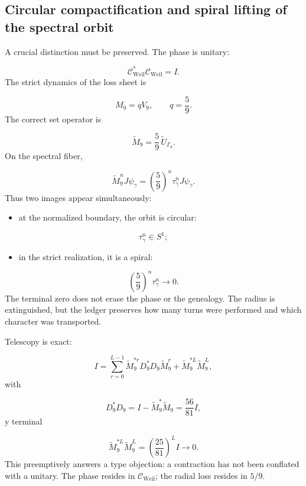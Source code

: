 \subsection{Circular compactification and spiral lifting of the spectral orbit}
A crucial distinction must be preserved. The phase is unitary:\par
\[
\mathcal C_{\mathrm{Weil}}^*
\mathcal C_{\mathrm{Weil}}=I.
\]
The strict dynamics of the loss sheet is\par
\[
M_9=qV_9,
\qquad
q=\frac59.
\]
The correct set operator is\par
\[
\widetilde M_9
=
\frac59\,\widetilde U_{\Gamma_9}.
\]
On the spectral fiber,\par
\[
\widetilde M_9^nJ\psi_\gamma
=
\left(\frac59\right)^n
\tau_\gamma^n
J\psi_\gamma.
\]
Thus two images appear simultaneously:\par
\begin{itemize}
\item at the normalized boundary, the orbit is circular:
\end{itemize}
  \[
  \tau_\gamma^n\in S^1;
  \]
\begin{itemize}
\item in the strict realization, it is a spiral:
\end{itemize}
  \[
  \left(\frac59\right)^n\tau_\gamma^n\longrightarrow0.
  \]
The terminal zero does not erase the phase or the genealogy. The radius is extinguished, but the ledger preserves how many turns were performed and which character was transported.\par
Telescopy is exact:\par
\[
I
=
\sum_{r=0}^{L-1}
\widetilde M_9^{*r}
D_9^*D_9
\widetilde M_9^r
+
\widetilde M_9^{*L}\widetilde M_9^L,
\]
with\par
\[
D_9^*D_9
=
I-\widetilde M_9^*\widetilde M_9
=
\frac{56}{81}I,
\]
y terminal\par
\[
\widetilde M_9^{*L}\widetilde M_9^L
=
\left(\frac{25}{81}\right)^LI
\longrightarrow0.
\]
This preemptively answers a type objection: a contraction has not been conflated with a unitary. The phase resides in \(\mathcal C_{\mathrm{Weil}}\); the radial loss resides in \(5/9\).\par
{}
